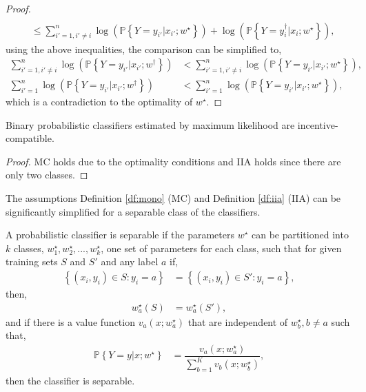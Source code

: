 \documentclass{article}
\begin{document}
\begin{proof}
\begin{align*}
\\ &\leq  \displaystyle\sum_{i'=1, i' \neq  i}^{n} \log\left(\mathbb{P}\left\{Y = y_{i'} | x_{i'} ; w^\star \right\}\right) + \log\left(\mathbb{P}\left\{Y = y^{\dagger}_{i} | x_{i} ; w^\star \right\}\right),
\end{align*}
using the above inequalities, the comparison can be simplified to,
\begin{align*}
\displaystyle\sum_{i'=1, i' \neq  i}^{n} \log\left(\mathbb{P}\left\{Y = y_{i'} | x_{i'} ; w^{\dagger}\right\}\right) &< \displaystyle\sum_{i'=1, i' \neq  i}^{n} \log\left(\mathbb{P}\left\{Y = y_{i'} | x_{i'} ; w^\star \right\}\right),
\\ \displaystyle\sum_{i'=1}^{n} \log\left(\mathbb{P}\left\{Y = y_{i'} | x_{i'} ; w^{\dagger}\right\}\right) &< \displaystyle\sum_{i'=1}^{n} \log\left(\mathbb{P}\left\{Y = y_{i'} | x_{i'} ; w^\star \right\}\right),
\end{align*}
which is a contradiction to the optimality of $w^\star $.
\newline \newline\end{proof}
\begin{cor} \label{cor:binpr} 
Binary probabilistic classifiers estimated by maximum likelihood are incentive-compatible.
\end{cor}
\begin{proof} \label{proof:binpr} 
MC holds due to the optimality conditions and IIA holds since there are only two classes.
\newline \newline\end{proof}
The assumptions Definition \ref{df:mono} (MC) and Definition \ref{df:iia} (IIA) can be significantly simplified for a separable class of the classifiers.
\newline \newline
\begin{df} \label{df:sep} 
A probabilistic classifier is separable if the parameters $w^\star $ can be partitioned into $k $ classes, $w^\star _{1}, w^\star _{2}, ..., w^\star _{k}$, one set of parameters for each class, such that for given training sets $S $ and $S'$ and any label $a $ if,
\begin{align*}
\left\{\left(x_{i}, y_{i}\right) \in S : y_{i} = a\right\} &= \left\{\left(x_{i}, y_{i}\right) \in S' : y_{i} = a\right\},
\end{align*}
then,
\begin{align*}
w^\star _{a}\left(S\right) &= w^\star _{a}\left(S'\right),
\end{align*}
and if there is a value function $v_{a}\left(x; w^\star _{a}\right)$ that are independent of $w^\star _{b}, b \neq  a $ such that,
\begin{align*}
\mathbb{P}\left\{Y = y | x; w^\star \right\} &= \dfrac{v_{a}\left(x; w^\star _{a}\right)}{\displaystyle\sum_{b=1}^{K} v_{b}\left(x; w^\star _{b}\right)},
\end{align*}
then the classifier is separable.
\newline \newline\end{df}
\end{document}
